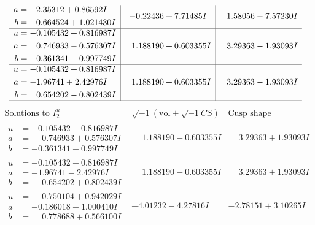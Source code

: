 \documentclass[1p]{elsarticle_modified}
\theoremstyle{definition}
\newcommand{\I}{\sqrt{-1}}
\begin{document}
$$\begin{array}{c|c|c}
\begin{aligned}
a &= -2.35312 + 0.86592 I \\
b &= \phantom{-}0.664524 + 1.021430 I\end{aligned}
 & -0.22436 + 7.71485 I & \phantom{-}1.58056 - 7.57230 I \\ \hline\begin{aligned}
u &= -0.105432 + 0.816987 I \\
a &= \phantom{-}0.746933 - 0.576307 I \\
b &= -0.361341 - 0.997749 I\end{aligned}
 & \phantom{-}1.188190 + 0.603355 I & \phantom{-}3.29363 - 1.93093 I \\ \hline\begin{aligned}
u &= -0.105432 + 0.816987 I \\
a &= -1.96741 + 2.42976 I \\
b &= \phantom{-}0.654202 - 0.802439 I\end{aligned}
 & \phantom{-}1.188190 + 0.603355 I & \phantom{-}3.29363 - 1.93093 I\\
 \hline 
 \end{array}$$\newpage$$\begin{array}{c|c|c}  
\text{Solutions to }I^u_{2}& \I (\text{vol} + \sqrt{-1}CS) & \text{Cusp shape}\\
 \hline 
\begin{aligned}
u &= -0.105432 - 0.816987 I \\
a &= \phantom{-}0.746933 + 0.576307 I \\
b &= -0.361341 + 0.997749 I\end{aligned}
 & \phantom{-}1.188190 - 0.603355 I & \phantom{-}3.29363 + 1.93093 I \\ \hline\begin{aligned}
u &= -0.105432 - 0.816987 I \\
a &= -1.96741 - 2.42976 I \\
b &= \phantom{-}0.654202 + 0.802439 I\end{aligned}
 & \phantom{-}1.188190 - 0.603355 I & \phantom{-}3.29363 + 1.93093 I \\ \hline\begin{aligned}
u &= \phantom{-}0.750104 + 0.942029 I \\
a &= -0.186018 - 1.000410 I \\
b &= \phantom{-}0.778688 + 0.566100 I\end{aligned}
 & -4.01232 - 4.27816 I & -2.78151 + 3.10265 I \\ \hline\begin{aligned}

\end{aligned}
\end{array}$$
\end{document}
